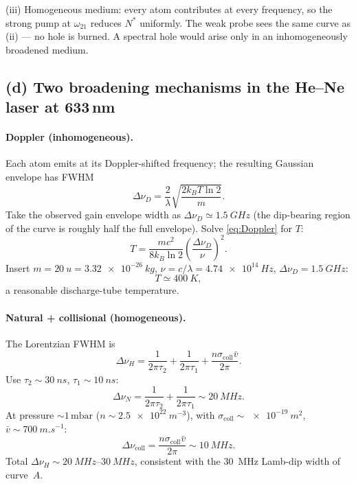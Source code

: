 \documentclass[11pt]{article}
\begin{document}
(iii) Homogeneous medium: every atom contributes at every frequency, so the strong pump at $\omega_{21}$ reduces $N^{*}$ uniformly. The weak probe sees the same curve as (ii) --- no hole is burned. A spectral hole would arise only in an inhomogeneously broadened medium.

\subsection*{(d) Two broadening mechanisms in the He--Ne laser at 633\,nm}

\paragraph{Doppler (inhomogeneous).} Each atom emits at its Doppler-shifted frequency; the resulting Gaussian envelope has FWHM
\begin{equation}
\Delta\nu_{D} = \frac{2}{\lambda}\sqrt{\frac{2k_{B}T\ln 2}{m}}.
\label{eq:Doppler}
\end{equation}
Take the observed gain envelope width as $\Delta\nu_{D}\simeq \SI{1.5}{GHz}$ (the dip-bearing region of the curve is roughly half the full envelope). Solve \eqref{eq:Doppler} for $T$:
\begin{equation}
T=\frac{mc^{2}}{8k_{B}\ln 2}\!\left(\frac{\Delta\nu_{D}}{\nu}\right)^{2}.
\end{equation}
Insert $m=\SI{20}{u}=\SI{3.32e-26}{kg}$, $\nu=c/\lambda=\SI{4.74e14}{Hz}$, $\Delta\nu_{D}=\SI{1.5}{GHz}$:
\begin{equation}
T\simeq \SI{400}{K},
\end{equation}
a reasonable discharge-tube temperature.

\paragraph{Natural + collisional (homogeneous).} The Lorentzian FWHM is
\begin{equation}
\boxed{\;\Delta\nu_{H}=\frac{1}{2\pi\tau_{2}}+\frac{1}{2\pi\tau_{1}}+\frac{n\sigma_{\mathrm{coll}}\bar v}{2\pi}.\;}
\label{eq:Lorentz-FWHM}
\end{equation}
Use $\tau_{2}\sim \SI{30}{ns}$, $\tau_{1}\sim \SI{10}{ns}$:
\begin{equation}
\Delta\nu_{N}=\frac{1}{2\pi\tau_{2}}+\frac{1}{2\pi\tau_{1}}\sim \SI{20}{MHz}.
\end{equation}
At pressure $\sim 1\,\mathrm{mbar}$ ($n\sim \SI{2.5e22}{m^{-3}}$), with $\sigma_{\mathrm{coll}}\sim \SI{e-19}{m^{2}}$, $\bar v\sim \SI{700}{m.s^{-1}}$:
\begin{equation}
\Delta\nu_{\mathrm{coll}}=\frac{n\sigma_{\mathrm{coll}}\bar v}{2\pi}\sim \SI{10}{MHz}.
\end{equation}
Total $\Delta\nu_{H}\sim \SIrange{20}{30}{MHz}$, consistent with the 30~MHz Lamb-dip width of curve~$A$.
\end{document}
